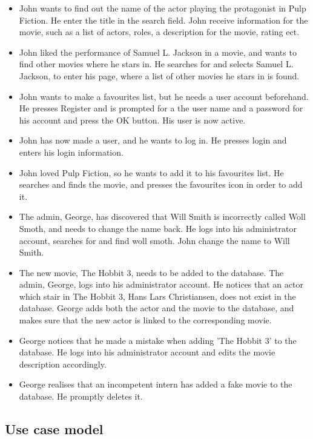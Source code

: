 \begin{itemize}
	\setlength{\itemsep}{-5pt}
	
	\item John wants to find out the name of the actor playing the protagonist in Pulp Fiction. He enter the title in the search field. John receive information for the movie, such as a list of actors, roles, a description for the movie, rating ect.
	\item John liked the performance of Samuel L. Jackson in a movie, and wants to find other movies where he stars in. He searches for and selects Samuel L. Jackson, to enter his page, where a list of other movies he stars in is found.
	\item John wants to make a favourites list, but he needs a user account beforehand. He presses Register and is prompted for a the user name and a password for his account and press the OK button. His user is now active.
	\item John has now made a user, and he wants to log in. He presses login and enters his login information.
	\item John loved Pulp Fiction, so he wants to add it to his favourites list. He searches and finds the movie, and presses the favourites icon in order to add it.
	
	\item The admin, George, has discovered that Will Smith is incorrectly called Woll Smoth, and needs to change the name back. He logs into his administrator account, searches for and find woll smoth. John change the name to Will Smith.
	\item The new movie, The Hobbit 3, needs to be added to the database. The admin, George, logs into his administrator account. He notices that an actor which stair in The Hobbit 3, Hans Lars Christiansen, does not exist in the database. George adds both the actor and the movie to the database, and makes sure that the new actor is linked to the corresponding movie.
	\item George notices that he made a mistake when adding 'The Hobbit 3' to the database. He logs into his administrator account and edits the movie description accordingly.
	\item George realises that an incompetent intern has added a fake movie to the database. He promptly deletes it.
\end{itemize}

\subsection{Use case model}



